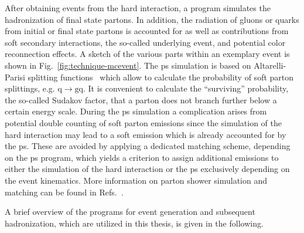 After obtaining events from the hard interaction, a  program simulates the hadronization of final state partons. In addition, the radiation of gluons or quarks from initial or final state partons is accounted for as well as contributions from soft secondary interactions, the so-called underlying event, and potential color reconnection effects. A sketch of the various parts within an exemplary event is shown in Fig.~\ref{fig:technique-mcevent}. The \gls{ps} simulation is based on Altarelli-Parisi splitting functions~\cite{Altarelli:1977zs} which allow to calculate the probability of soft parton splittings, e.g. $\mathrm{q}\to \mathrm{gq}$. It is convenient to calculate the ``surviving'' probability, the so-called Sudakov factor, that a parton does not branch further below a certain energy scale. During the \gls{ps} simulation a complication arises from potential double counting of soft parton emissions since the simulation of the hard interaction may lead to a soft emission which is already accounted for by the \gls{ps}. These are avoided by applying a dedicated matching scheme, depending on the \gls{ps} program, which yields a criterion to assign additional emissions to either the simulation of the hard interaction or the \gls{ps} exclusively depending on the event kinematics. More information on parton shower simulation and matching can be found in Refs.~\cite{Hoche:2014rga,Hoche:2006ph}.



A brief overview of the programs for event generation and subsequent hadronization, which are utilized in this thesis, is given in the following.

